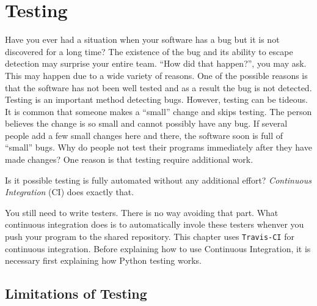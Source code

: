 \chapter{Testing}


Have you ever had a situation when your software has a bug but it is
not discovered for a long time?  The existence of the bug and its
ability to escape detection may surprise your entire team. ``How did
that happen?'', you may ask.  This may happen due to a wide variety of
reasons. One of the possible reasons is that the software has not been
well tested and as a result the bug is not detected. Testing is an
important method detecting bugs.  However, testing can be tideous.  It
is common that someone makes a ``small'' change and skips testing.
The person believes the change is so small and cannot possibly have
any bug.  If several people add a few small changes here and there,
the software soon is full of ``small'' bugs.  Why do people not test
their programs immediately after they have made changes?  One reason
is that testing require additional work.

Is it possible testing is fully automated without any additional
effort? {\it Continuous Integration} (CI) does exactly that.

You still need to write testers. There is no way avoiding that part.
What continuous integration does is to automatically invole these
testers whenver you push your program to the shared repository.
This chapter uses {\tt Travis-CI} for continuous integration. Before explaining how
to use Continuous Integration, it is necessary first explaining how Python
testing works.

\section{Limitations of Testing}


